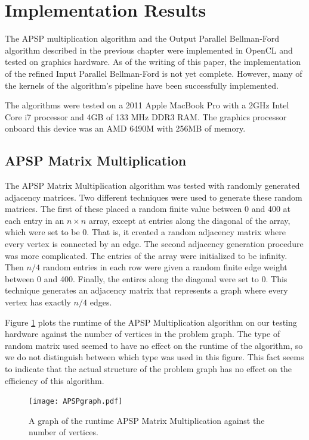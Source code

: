 \documentclass[12pt,twoside]{reedthesis}
\begin{document}
\section{Implementation Results}

The APSP multiplication algorithm and the Output Parallel Bellman-Ford algorithm described in the previous chapter were implemented in OpenCL and tested on graphics hardware. As of the writing of this paper, the implementation of the refined Input Parallel Bellman-Ford is not yet complete. However, many of the kernels of the algorithm's pipeline have been successfully implemented.

The algorithms were tested on a 2011 Apple MacBook Pro with a 2GHz Intel Core i7 processor and 4GB of 133 MHz DDR3 RAM. The graphics processor onboard this device was an AMD 6490M with 256MB of memory.

\subsection{APSP Matrix Multiplication}

The APSP Matrix Multiplication algorithm was tested with randomly generated adjacency matrices. Two different techniques were used to generate these random matrices. The first of these placed a random finite value between 0 and 400 at each entry in an $n \times n$ array, except at entries along the diagonal of the array, which were set to be 0. That is, it created a random adjacency matrix where every vertex is connected by an edge. The second adjacency generation procedure was more complicated. The entries of the array were initialized to be infinity. Then $n/4$ random entries in each row were given a random finite edge weight between 0 and 400. Finally, the entires along the diagonal were set to 0. This technique generates an adjacency matrix that represents a graph where every vertex has exactly $n/4$ edges.

Figure \ref{fig:apspruntime} plots the runtime of the APSP Multiplication algorithm on our testing hardware against the number of vertices in the problem graph. The type of random matrix used seemed to have no effect on the runtime of the algorithm, so we do not distinguish between which type was used in this figure. This fact seems to indicate that the actual structure of the problem graph has no effect on the efficiency of this algorithm.

\begin{figure}[h!]
\begin{center}
\texttt{[image: APSPgraph.pdf]}
\end{center}
\caption{A graph of the runtime APSP Matrix Multiplication against the number of vertices.}
\label{fig:apspruntime}
\end{figure}
\end{document}
